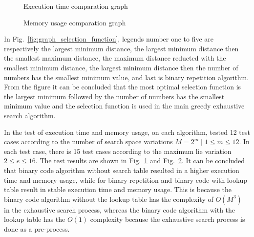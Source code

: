\documentclass{TTP_DSL2006}
\begin{document}
\begin{figure}
	\centering
	\caption{Execution time comparation graph}
	\label{fig:graph_time}
\end{figure}

\begin{figure}
	\centering
	\caption{Memory usage comparation graph}
	\label{fig:graph_memory}
\end{figure}

In Fig.~\ref{fig:graph_selection_function}, legends number one to five are respectively the largest minimum distance, the largest minimum distance then the smallest maximum distance, the maximum distance reducted with the smallest minimum distance, the largest minimum distance then the number of numbers has the smallest minimum value, and last is binary repetition algorithm. From the figure it can be concluded that the most optimal selection function is the largest minimum followed by the number of numbers has the smallest minimum value and the selection function is used in the main greedy exhaustive search algorithm.

In the test of execution time and memory usage, on each algorithm, tested 12 test cases according to the number of search space variations $M = 2^m \mid 1 \leq m \leq 12$. In each test case, there is 15 test cases according to the maximum lie variation $2 \leq e \leq 16$. The test results are shown in Fig.~\ref{fig:graph_time} and Fig.~\ref{fig:graph_memory}. It can be concluded that binary code algorithm without search table resulted in a higher execution time and memory usage, while for binary repetition and binary code with lookup table result in stable execution time and memory usage. This is because the binary code algorithm without the lookup table has the complexity of $O(M^3) $ in the exhaustive search process, whereas the binary code algorithm with the lookup table has the $O(1)$ complexity because the exhaustive search process is done as a pre-process.
\end{document}
